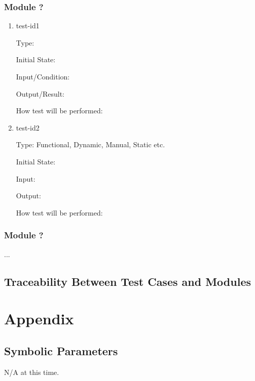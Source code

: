 \documentclass[12pt, titlepage]{article}
\begin{document}
\subsubsection{Module ?}
		
\begin{enumerate}

\item{test-id1\\}

Type: 
					
Initial State: 
					
Input/Condition: 
					
Output/Result: 
					
How test will be performed: 
					
\item{test-id2\\}

Type: Functional, Dynamic, Manual, Static etc.
					
Initial State: 
					
Input: 
					
Output: 
					
How test will be performed: 

\end{enumerate}

\subsubsection{Module ?}

...

\subsection{Traceability Between Test Cases and Modules}

				




\newpage

\section{Appendix}


\subsection{Symbolic Parameters}

N/A at this time.
\end{document}
